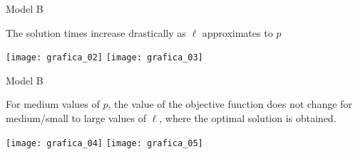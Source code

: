 \begin{frame}{Model B}

  The solution times increase drastically as $\ell$ approximates to $p$
  
  \begin{center}
    \texttt{[image: grafica\_02]}
    \texttt{[image: grafica\_03]}
  \end{center}
  
\end{frame}

\begin{frame}{Model B}

  For medium values of $p$, the value of the objective function does not change
  for medium/small to large values of $\ell$, where the optimal solution is obtained.

  \begin{center}
    \texttt{[image: grafica\_04]}
    \texttt{[image: grafica\_05]}
  \end{center}
  
\end{frame}

